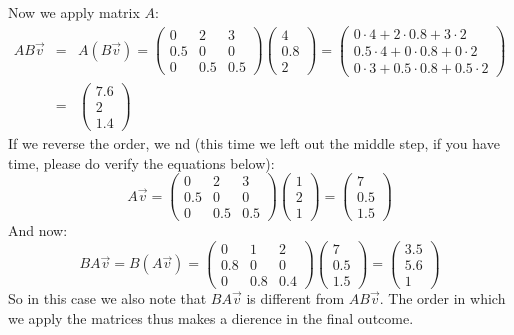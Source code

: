 \documentclass[a4paper]{report}
\begin{document}
\begin{mdframed}[backgroundcolor=exampcol]
\begin{equation*}
\end{equation*}
Now we apply matrix $A$:
\begin{eqnarray*}
AB\vec{v}&=&A(B\vec{v})=\begin{pmatrix} 0 & 2 & 3\\0.5 & 0 & 0\\0 & 0.5 & 0.5 \end{pmatrix}\begin{pmatrix}4\\0.8\\2\end{pmatrix}= \begin{pmatrix}0 \cdot 4+2 \cdot 0.8+3\cdot2\\0.5\cdot 4 + 0\cdot 0.8 + 0 \cdot 2\\0\cdot 3+ 0.5\cdot 0.8+0.5 \cdot 2\end{pmatrix}\\
&=&\begin{pmatrix}7.6\\2\\1.4\end{pmatrix}
\end{eqnarray*}
If we reverse the order, we nd (this time we left out the middle step, if
you have time, please do verify the equations below):
\begin{equation*}
A\vec{v}=\begin{pmatrix} 0 & 2 & 3\\0.5 & 0 & 0\\0 & 0.5 & 0.5 \end{pmatrix}\begin{pmatrix} 1\\2\\1\end{pmatrix}=\begin{pmatrix} 7\\0.5\\1.5\end{pmatrix}
\end{equation*}
And now:
\begin{equation*}
BA\vec{v}=B(A\vec{v})=\begin{pmatrix} 0 & 1 & 2\\0.8 & 0 & 0\\0 & 0.8 & 0.4 \end{pmatrix}\begin{pmatrix} 7\\0.5\\1.5\end{pmatrix}=\begin{pmatrix} 3.5\\5.6\\1\end{pmatrix}
\end{equation*}
So in this case we also note that $BA\vec{v}$ is different from $AB\vec{v}$. The order in which we apply the matrices thus makes a dierence in the final outcome.
\end{mdframed}
\end{document}
